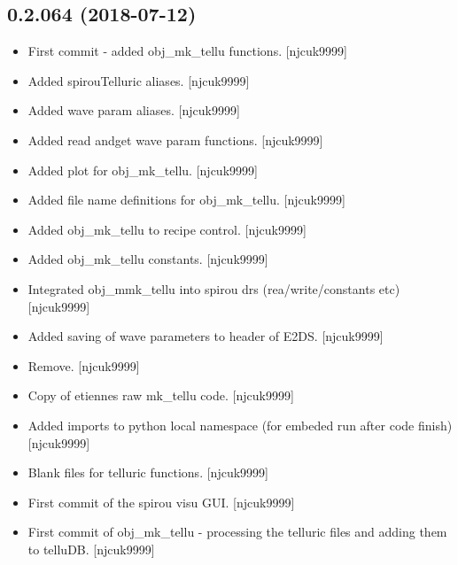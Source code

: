 \documentclass[a4paper,10pt,english]{report}
\begin{document}
\subsection{0.2.064 (2018-07-12)}
\label{\detokenize{misc/changelog:id394}}\begin{itemize}
\item {} 
First commit - added obj\_mk\_tellu functions. {[}njcuk9999{]}

\item {} 
Added spirouTelluric aliases. {[}njcuk9999{]}

\item {} 
Added wave param aliases. {[}njcuk9999{]}

\item {} 
Added read andget wave param functions. {[}njcuk9999{]}

\item {} 
Added plot for obj\_mk\_tellu. {[}njcuk9999{]}

\item {} 
Added file name definitions for obj\_mk\_tellu. {[}njcuk9999{]}

\item {} 
Added obj\_mk\_tellu to recipe control. {[}njcuk9999{]}

\item {} 
Added obj\_mk\_tellu constants. {[}njcuk9999{]}

\item {} 
Integrated obj\_mmk\_tellu into spirou drs (rea/write/constants etc)
{[}njcuk9999{]}

\item {} 
Added saving of wave parameters to header of E2DS. {[}njcuk9999{]}

\item {} 
Remove. {[}njcuk9999{]}

\item {} 
Copy of etiennes raw mk\_tellu code. {[}njcuk9999{]}

\item {} 
Added imports to python local namespace (for embeded run after code
finish) {[}njcuk9999{]}

\item {} 
Blank files for telluric functions. {[}njcuk9999{]}

\item {} 
First commit of the spirou visu GUI. {[}njcuk9999{]}

\item {} 
First commit of obj\_mk\_tellu - processing the telluric files and
adding them to telluDB. {[}njcuk9999{]}

\end{itemize}
\end{document}
